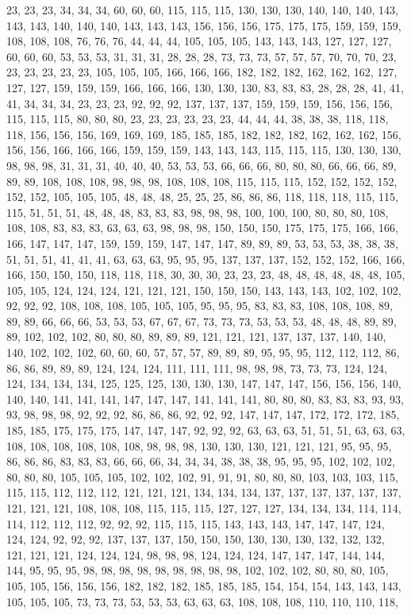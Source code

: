 23, 23, 23, 34, 34, 34, 60, 60, 60, 115, 115, 115, 130, 130, 130, 140, 140, 140, 143, 143, 143, 140, 140, 140, 143, 143, 143, 156, 156, 156, 175, 175, 175, 159, 159, 159, 108, 108, 108, 76, 76, 76, 44, 44, 44, 105, 105, 105, 143, 143, 143, 127, 127, 127, 60, 60, 60, 53, 53, 53, 31, 31, 31, 28, 28, 28, 73, 73, 73, 57, 57, 57, 70, 70, 70, 23, 23, 23, 23, 23, 23, 105, 105, 105, 166, 166, 166, 182, 182, 182, 162, 162, 162, 127, 127, 127, 159, 159, 159, 166, 166, 166, 130, 130, 130, 83, 83, 83, 28, 28, 28, 41, 41, 41, 34, 34, 34, 23, 23, 23, 92, 92, 92, 137, 137, 137, 159, 159, 159, 156, 156, 156, 115, 115, 115, 80, 80, 80, 23, 23, 23, 23, 23, 23, 44, 44, 44, 38, 38, 38, 118, 118, 118, 156, 156, 156, 169, 169, 169, 185, 185, 185, 182, 182, 182, 162, 162, 162, 156, 156, 156, 166, 166, 166, 159, 159, 159, 143, 143, 143, 115, 115, 115, 130, 130, 130, 98, 98, 98, 31, 31, 31, 40, 40, 40, 53, 53, 53, 66, 66, 66, 80, 80, 80, 66, 66, 66, 89, 89, 89, 108, 108, 108, 98, 98, 98, 108, 108, 108, 115, 115, 115, 152, 152, 152, 152, 152, 152, 105, 105, 105, 48, 48, 48, 25, 25, 25, 86, 86, 86, 118, 118, 118, 115, 115, 115, 51, 51, 51, 48, 48, 48, 83, 83, 83, 98, 98, 98, 100, 100, 100, 80, 80, 80, 108, 108, 108, 83, 83, 83, 63, 63, 63, 98, 98, 98, 150, 150, 150, 175, 175, 175, 166, 166, 166, 147, 147, 147, 159, 159, 159, 147, 147, 147, 89, 89, 89, 53, 53, 53, 38, 38, 38, 51, 51, 51, 41, 41, 41, 63, 63, 63, 95, 95, 95, 137, 137, 137, 152, 152, 152, 166, 166, 166, 150, 150, 150, 118, 118, 118, 30, 30, 30, 23, 23, 23, 48, 48, 48, 48, 48, 48, 105, 105, 105, 124, 124, 124, 121, 121, 121, 150, 150, 150, 143, 143, 143, 102, 102, 102, 92, 92, 92, 108, 108, 108, 105, 105, 105, 95, 95, 95, 83, 83, 83, 108, 108, 108, 89, 89, 89, 66, 66, 66, 53, 53, 53, 67, 67, 67, 73, 73, 73, 53, 53, 53, 48, 48, 48, 89, 89, 89, 102, 102, 102, 80, 80, 80, 89, 89, 89, 121, 121, 121, 137, 137, 137, 140, 140, 140, 102, 102, 102, 60, 60, 60, 57, 57, 57, 89, 89, 89, 95, 95, 95, 112, 112, 112, 86, 86, 86, 89, 89, 89, 124, 124, 124, 111, 111, 111, 98, 98, 98, 73, 73, 73, 124, 124, 124, 134, 134, 134, 125, 125, 125, 130, 130, 130, 147, 147, 147, 156, 156, 156, 140, 140, 140, 141, 141, 141, 147, 147, 147, 141, 141, 141, 80, 80, 80, 83, 83, 83, 93, 93, 93, 98, 98, 98, 92, 92, 92, 86, 86, 86, 92, 92, 92, 147, 147, 147, 172, 172, 172, 185, 185, 185, 175, 175, 175, 147, 147, 147, 92, 92, 92, 63, 63, 63, 51, 51, 51, 63, 63, 63, 108, 108, 108, 108, 108, 108, 98, 98, 98, 130, 130, 130, 121, 121, 121, 95, 95, 95, 86, 86, 86, 83, 83, 83, 66, 66, 66, 34, 34, 34, 38, 38, 38, 95, 95, 95, 102, 102, 102, 80, 80, 80, 105, 105, 105, 102, 102, 102, 91, 91, 91, 80, 80, 80, 103, 103, 103, 115, 115, 115, 112, 112, 112, 121, 121, 121, 134, 134, 134, 137, 137, 137, 137, 137, 137, 121, 121, 121, 108, 108, 108, 115, 115, 115, 127, 127, 127, 134, 134, 134, 114, 114, 114, 112, 112, 112, 92, 92, 92, 115, 115, 115, 143, 143, 143, 147, 147, 147, 124, 124, 124, 92, 92, 92, 137, 137, 137, 150, 150, 150, 130, 130, 130, 132, 132, 132, 121, 121, 121, 124, 124, 124, 98, 98, 98, 124, 124, 124, 147, 147, 147, 144, 144, 144, 95, 95, 95, 98, 98, 98, 98, 98, 98, 98, 98, 98, 102, 102, 102, 80, 80, 80, 105, 105, 105, 156, 156, 156, 182, 182, 182, 185, 185, 185, 154, 154, 154, 143, 143, 143, 105, 105, 105, 73, 73, 73, 53, 53, 53, 63, 63, 63, 108, 108, 108, 110, 110, 110, 118, 
